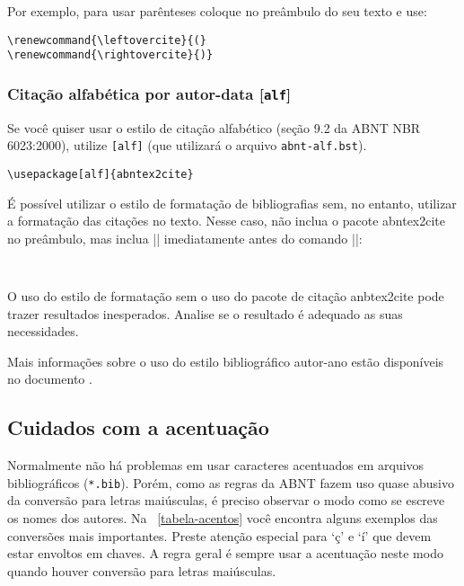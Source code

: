 \documentclass[a4paper]{ltxdoc}
\begin{document}
Por exemplo, para usar parênteses coloque no preâmbulo do seu texto e use:

\begin{verbatim}
\renewcommand{\leftovercite}{(}
\renewcommand{\rightovercite}{)}
\end{verbatim}


\subsubsection{Citação alfabética por autor-data [\texttt{alf}]}

\DescribeMacro{\usepackage[alf]{abntex2cite}}
Se você quiser usar o estilo de citação alfabético
(seção 9.2 da ABNT NBR 6023:2000\cite{NBR6023:2000}),
utilize \texttt{[alf]} (que utilizará o arquivo \texttt{abnt-alf.bst}).

\begin{verbatim}
\usepackage[alf]{abntex2cite}
\end{verbatim}

É possível utilizar o estilo de formatação de bibliografias sem, no entanto,
utilizar a formatação das citações no texto. Nesse caso, não inclua o pacote
\textsf{abntex2cite} no preâmbulo, mas inclua ||
imediatamente antes do comando
||:

\begin{verbatim}


\end{verbatim}

O uso do estilo de formatação sem o uso do pacote de citação
\textsf{anbtex2cite} pode trazer resultados inesperados. Analise se o resultado
é adequado as suas necessidades.

Mais informações sobre o uso do estilo bibliográfico autor-ano estão disponíveis
no documento .

\subsection{Cuidados com a acentuação}

Normalmente não há problemas em usar caracteres acentuados em arquivos
bibliográficos (\texttt{*.bib}). Porém, como as regras da ABNT fazem uso quase
abusivo da conversão para letras maiúsculas, é preciso observar o modo como se
escreve os nomes dos autores. Na ~\autoref{tabela-acentos} você encontra alguns
exemplos das conversões mais importantes. Preste atenção especial para `ç' e `í'
que devem estar envoltos em chaves. A regra geral é sempre usar a acentuação
neste modo quando houver conversão para letras maiúsculas.
\end{document}
